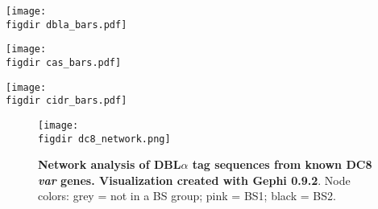 \documentclass[10pt,twocolumn,superscriptaddress]{revtex4-1}
\newcommand{\var}{{\it var}\xspace}
\newcommand{\dbla}{{DBL$\alpha$}\xspace}
\newcommand{\cp}{{Cys/PoLV}\xspace}
\newcommand{\paper}{{Githinji \& Bull}\xspace}
\newcommand{\figdir}{figures/}
\begin{document}
\begin{figure*}[t]
	\centering
	\texttt{[image: \\figdir dbla\_bars.pdf]}
	\caption{{\bf Correspondence between \var sequence classifications and presence of specific \dbla domains}. \var sequences are classified based on \dbla domains (horizontal axis) they contain. The proportion of the genes carrying other sequence features (UPS, \cp, block-sharing groups, select homology blocks) is shown on the vertical axis. Like in \paper, the \dbla domains are, from left to right, in order of decreasing UPSA sequences.}
	\label{dbla_bars}
\end{figure*}

\begin{figure*}[t]
	\centering
	\texttt{[image: \\figdir cas\_bars.pdf]}
	\caption{{\bf Correspondence between \var sequence classifications and presence of specific domain cassettes (DCs). \var sequences are classified based on DCs (horizontal axis) they contain}. The proportion of the genes carrying other sequence features (UPS, \cp, block-sharing groups, select homology blocks) is shown on the vertical axis. Like in \paper, the DCs are, from left to right, in order of decreasing UPSA sequences. }
	\label{cas_bars}
\end{figure*}

\begin{figure*}[t]
	\centering
	\texttt{[image: \\figdir cidr\_bars.pdf]}
	\caption{{\bf Correspondence between \var sequence classifications and presence of specific CIDR1 domains. \var sequences are classified based on CIDR1 domains (horizontal axis) they contain}. The proportion of the genes carrying other sequence features (UPS, \cp, block- sharing groups, select homology blocks) is shown on the vertical axis. Like in \paper, the CIDR1 domains are, from left to right, in order of decreasing UPSA sequences. }
	\label{cidr_bars}
\end{figure*}

\begin{figure}[t]
	\centering
	\texttt{[image: \\figdir dc8\_network.png]}
	\caption{{\bf Network analysis of \dbla tag sequences from known DC8 \var genes. Visualization created with Gephi 0.9.2}. Node colors: grey = not in a BS group; pink = BS1; black = BS2.}
	\label{dc8_network}
\end{figure}
\end{document}
